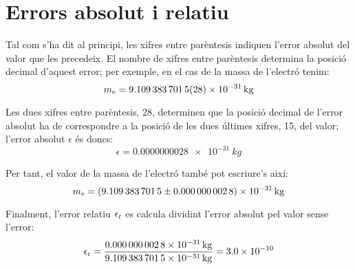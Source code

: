    
  
  
  
  
  
 \index{$\sigma$}  


\section{Errors absolut i relatiu}\label{err_abs_rel}

Tal com s'ha dit al principi, les xifres entre parèntesis indiquen l'error absolut del valor que les precedeix. El nombre de xifres entre parèntesis determina la posició decimal d'aquest error; per exemple, en el cas de la  massa de l'electró tenim:
\[
    m\ped{e} = \SI{9,109 383 7015(28) e-31}{kg}
\]

Les dues xifres entre parèntesis, 28, determinen que la posició decimal de l'error absolut ha de correspondre a la posició de les dues últimes xifres, 15, del valor; l'error absolut $\epsilon$  és doncs:
\[
    \epsilon = \SI{0,000 000 0028 e-31}{kg}
\]

Per tant, el valor de la massa de l'electró també pot escriure's així:
 \[
    m\ped{e} = \SI[separate-uncertainty]{9,109 383 7015(28) e-31}{kg}
\]

Finalment, l'error relatiu $\epsilon\ped{r}$ es calcula dividint l'error absolut pel valor sense l'error:
\[
    \epsilon\ped{r} = \frac{\SI{0,000 000 0028 e-31}{kg}}{\SI{9,109 383 7015 e-31}{kg}} =   \num{3,0e-10}
\]
